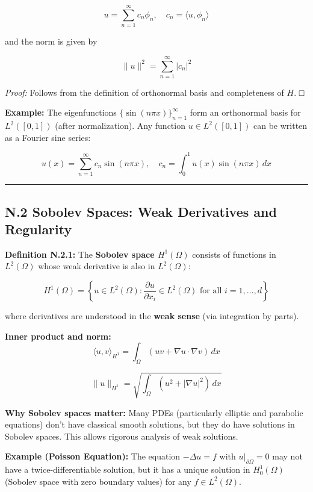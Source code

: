 \documentclass[
]{article}
\begin{document}
\[u = \sum_{n=1}^\infty c_n \phi_n, \quad c_n = \langle u, \phi_n \rangle\]

and the norm is given by

\[\|u\|^2 = \sum_{n=1}^\infty |c_n|^2\]

\emph{Proof:} Follows from the definition of orthonormal basis and
completeness of \(H\). □

\textbf{Example:} The eigenfunctions \(\{\sin(n\pi x)\}_{n=1}^\infty\)
form an orthonormal basis for \(L^2([0,1])\) (after normalization). Any
function \(u \in L^2([0,1])\) can be written as a Fourier sine series:

\[u(x) = \sum_{n=1}^\infty c_n \sin(n\pi x), \quad c_n = \int_0^1 u(x)\sin(n\pi x)\,dx\]

\begin{center}\rule{0.5\linewidth}{0.5pt}\end{center}

\subsection{N.2 Sobolev Spaces: Weak Derivatives and
Regularity}\label{n.2-sobolev-spaces-weak-derivatives-and-regularity}

\textbf{Definition N.2.1:} The \textbf{Sobolev space \(H^1(\Omega)\)}
consists of functions in \(L^2(\Omega)\) whose weak derivative is also
in \(L^2(\Omega)\):

\[H^1(\Omega) = \left\{ u \in L^2(\Omega) : \frac{\partial u}{\partial x_i} \in L^2(\Omega) \text{ for all } i = 1, \ldots, d \right\}\]

where derivatives are understood in the \textbf{weak sense} (via
integration by parts).

\textbf{Inner product and norm:}
\[\langle u, v \rangle_{H^1} = \int_\Omega (uv + \nabla u \cdot \nabla v)\,dx\]

\[\|u\|_{H^1} = \sqrt{\int_\Omega (u^2 + |\nabla u|^2)\,dx}\]

\textbf{Why Sobolev spaces matter:} Many PDEs (particularly elliptic and
parabolic equations) don't have classical smooth solutions, but they do
have solutions in Sobolev spaces. This allows rigorous analysis of weak
solutions.

\textbf{Example (Poisson Equation):} The equation \(-\Delta u = f\) with
\(u|_{\partial\Omega} = 0\) may not have a twice-differentiable
solution, but it has a unique solution in \(H^1_0(\Omega)\) (Sobolev
space with zero boundary values) for any \(f \in L^2(\Omega)\).
\end{document}
